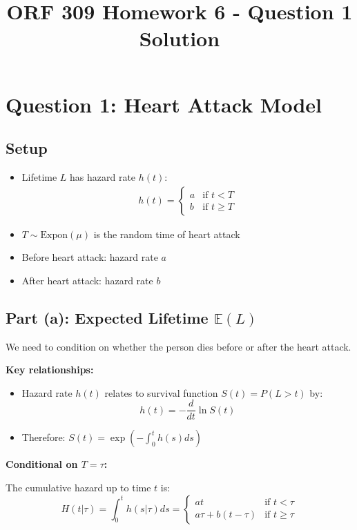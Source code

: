 \documentclass[11pt]{article}
\title{ORF 309 Homework 6 - Question 1 Solution}
\author{}
\date{}
\begin{document}
\maketitle

\section*{Question 1: Heart Attack Model}

\subsection*{Setup}
\begin{itemize}
    \item Lifetime $L$ has hazard rate $h(t)$:
    \begin{align*}
        h(t) = \begin{cases}
            a & \text{if } t < T \\
            b & \text{if } t \geq T
        \end{cases}
    \end{align*}
    \item $T \sim \text{Expon}(\mu)$ is the random time of heart attack
    \item Before heart attack: hazard rate $a$
    \item After heart attack: hazard rate $b$
\end{itemize}

\subsection*{Part (a): Expected Lifetime $\mathbb{E}(L)$}

We need to condition on whether the person dies before or after the heart attack.

\textbf{Key relationships:}
\begin{itemize}
    \item Hazard rate $h(t)$ relates to survival function $S(t) = P(L > t)$ by:
    $$h(t) = -\frac{d}{dt}\ln S(t)$$
    \item Therefore: $S(t) = \exp\left(-\int_0^t h(s)ds\right)$
\end{itemize}

\textbf{Conditional on $T = \tau$:}

The cumulative hazard up to time $t$ is:
$$H(t|\tau) = \int_0^t h(s|\tau) ds = \begin{cases}
    at & \text{if } t < \tau \\
    a\tau + b(t-\tau) & \text{if } t \geq \tau
\end{cases}$$
\end{document}
